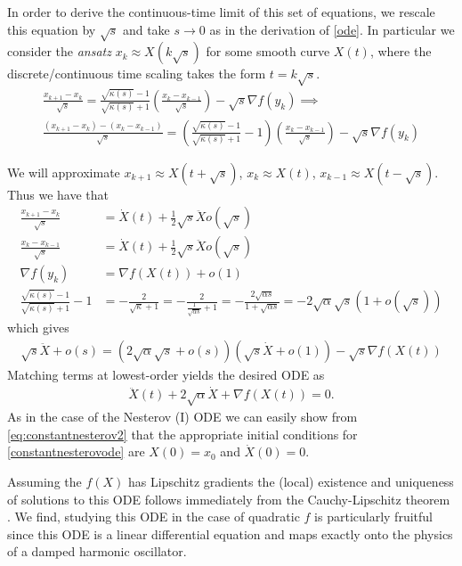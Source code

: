  In order to derive the continuous-time limit of this set of equations, we rescale this equation by $\sqrt{s}$ and take $s \to 0$ as in the derivation of \eqref{ode}. In particular we consider the \textit{ansatz} $x_k \approx X(k \sqrt{s})$ for some smooth curve $X(t)$, where the discrete/continuous time scaling takes the form $t = k \sqrt{s}$.
 \begin{align*}
    \frac{x_{k+1}-x_k}{\sqrt{s}} = \frac{\sqrt{\kappa(s)}-1}{\sqrt{\kappa(s)}+1} \left( \frac{x_{k}-x_{k-1}}{\sqrt{s}} \right) - \sqrt{s} \nabla f(y_k) \implies \\
    \frac{(x_{k+1}-x_k)-(x_{k}-x_{k-1})}{\sqrt{s}} = (\frac{\sqrt{\kappa(s)}-1}{\sqrt{\kappa(s)}+1}-1) \left( \frac{x_{k}-x_{k-1}}{\sqrt{s}} \right) - \sqrt{s} \nabla f(y_k)
 \end{align*}
 
 We will approximate $x_{k+1} \approx X(t+\sqrt{s})$, $x_k \approx X(t)$, $x_{k-1} \approx X(t-\sqrt{s})$.
 Thus we have that
 \begin{align*}
     \frac{x_{k+1} - x_k}{\sqrt{s}} &= \dot{X}(t) + \frac{1}{2} \sqrt{s} \ddot{X} o(\sqrt{s}) \\
     \frac{x_k - x_{k-1}}{\sqrt{s}} &= \dot{X}(t) + \frac{1}{2} \sqrt{s} \ddot{X} o(\sqrt{s}) \\
     \nabla f(y_k) &= \nabla f(X(t)) + o(1) \\
    \frac{\sqrt{\kappa(s)}-1}{\sqrt{\kappa(s)}+1}-1 &= -\frac{2}{\sqrt{\kappa}+1} = -\frac{2}{\frac{1}{\sqrt{\alpha s}}+1} = -\frac{2 \sqrt{\alpha s}}{1+\sqrt{\alpha s}} = -2 \sqrt{\alpha} \sqrt{s} (1+o(\sqrt{s}))
 \end{align*}
 which gives
 \begin{align*}
     \sqrt{s} \ddot{X} + o(s) = (2 \sqrt{\alpha} \sqrt{s} + o(s))(\sqrt{s} \dot{X} + o(1)) - \sqrt{s} \nabla f(X(t))
 \end{align*}
 Matching terms at lowest-order yields the desired ODE as
 \begin{align}
     \ddot{X}(t) + 2 \sqrt{\alpha} \dot{X} + \nabla f(X(t)) = 0. \label{constantnesterovode}
 \end{align}
As in the case of the Nesterov (I) ODE we can easily show from \eqref{eq:constantnesterov2} that the appropriate initial conditions for \eqref{constantnesterovode} are $X(0) = x_0$ and $\dot{X}(0)=0$.

Assuming the $f(X)$ has Lipschitz gradients the (local) existence and uniqueness of solutions to this ODE follows immediately from the Cauchy-Lipschitz theorem \citep{teschl2012ordinary}. We find, studying this ODE in the case of quadratic $f$ is particularly fruitful since this ODE is a linear differential equation and maps exactly onto the physics of a damped harmonic oscillator.

